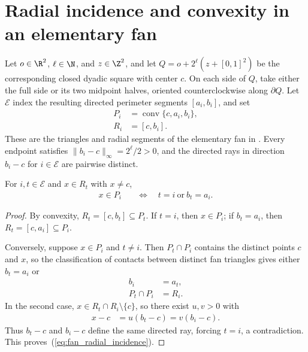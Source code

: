 \section{Radial incidence and convexity in an elementary fan}
\label{sec:area_law_fan_radial_incidence_convexity}

Let $o\in\R^2$, $\ell\in\N$, and $z\in\Z^2$, and let
$Q=o+2^\ell(z+[0,1]^2)$ be the corresponding closed dyadic square with
center $c$. On each side of $Q$, take either the full side or its two
midpoint halves, oriented counterclockwise along $\partial Q$. Let
$\mathcal E$ index the resulting directed perimeter segments $[a_i,b_i]$,
and set
\begin{align}
    P_i & =\operatorname{conv}\{c,a_i,b_i\}, \\
    R_i & =[c,b_i].
\end{align}
These are the triangles and radial segments of the elementary fan in
\cite[Section~11]{OpenAI2026AreaLaw}. Every endpoint satisfies
$\|b_i-c\|_\infty=2^\ell/2>0$, and the directed rays in direction
$b_i-c$ for $i\in\mathcal E$ are pairwise distinct.


\begin{lemma}
    \label{thm:area_law_fan_noncentral_radial_incidence}
    \leanok
    For $i,t\in\mathcal E$ and $x\in R_t$ with $x\ne c$,
    \begin{align}
        x\in P_i & \quad\Longleftrightarrow\quad
        t=i\ \text{or}\ b_t=a_i.
        \label{eq:fan_radial_incidence}
    \end{align}
\end{lemma}
\begin{proof}\leanok
    By convexity, $R_t=[c,b_t]\subseteq P_t$. If $t=i$, then $x\in P_i$; if
    $b_t=a_i$, then $R_t=[c,a_i]\subseteq P_i$.

    Conversely, suppose $x\in P_i$ and $t\ne i$. Then $P_t\cap P_i$ contains
    the distinct points $c$ and $x$, so the classification of contacts
    between distinct fan triangles gives either $b_t=a_i$ or
    \begin{align}
        b_i         & =a_t, \\
        P_t\cap P_i & =R_i.
    \end{align}
    In the second case, $x\in R_t\cap R_i\setminus\{c\}$, so there exist
    $u,v>0$ with
    \begin{align}
        x-c & =u(b_t-c)=v(b_i-c).
    \end{align}
    Thus $b_t-c$ and $b_i-c$ define the same directed ray, forcing $t=i$, a
    contradiction. This proves~(\ref{eq:fan_radial_incidence}).
\end{proof}


